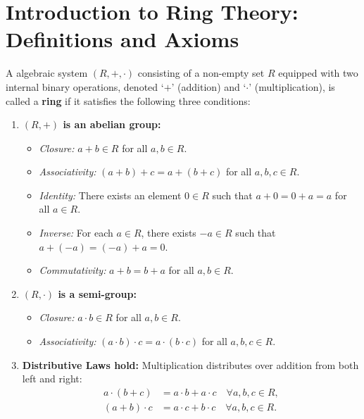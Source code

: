 \section{Introduction to Ring Theory: Definitions and Axioms}

\begin{definition}[Ring]
A algebraic system $(R, +, \cdot)$ consisting of a non-empty set $R$ equipped with two internal binary operations, denoted `$+$' (addition) and `$\cdot$' (multiplication), is called a \textbf{ring} if it satisfies the following three conditions:
\begin{enumerate}
    \item \textbf{$(R, +)$ is an abelian group:}
    \begin{itemize}
        \item \emph{Closure:} $a + b \in R$ for all $a, b \in R$.
        \item \emph{Associativity:} $(a + b) + c = a + (b + c)$ for all $a, b, c \in R$.
        \item \emph{Identity:} There exists an element $0 \in R$ such that $a + 0 = 0 + a = a$ for all $a \in R$.
        \item \emph{Inverse:} For each $a \in R$, there exists $-a \in R$ such that $a + (-a) = (-a) + a = 0$.
        \item \emph{Commutativity:} $a + b = b + a$ for all $a, b \in R$.
    \end{itemize}
    
    \item \textbf{$(R, \cdot)$ is a semi-group:}
    \begin{itemize}
        \item \emph{Closure:} $a \cdot b \in R$ for all $a, b \in R$.
        \item \emph{Associativity:} $(a \cdot b) \cdot c = a \cdot (b \cdot c)$ for all $a, b, c \in R$.
    \end{itemize}
    
    \item \textbf{Distributive Laws hold:} Multiplication distributes over addition from both left and right:
    \begin{align*}
    a \cdot (b + c) &= a \cdot b + a \cdot c \quad \forall a, b, c \in R, \\
    (a + b) \cdot c &= a \cdot c + b \cdot c \quad \forall a, b, c \in R.
    \end{align*}
\end{enumerate}
\end{definition}

